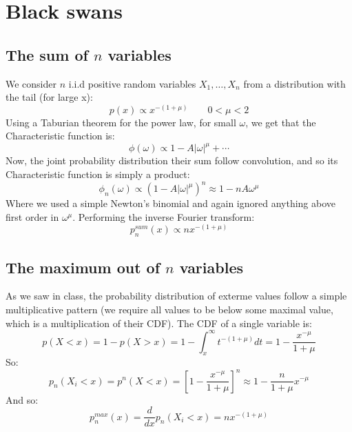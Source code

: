 \documentclass{article}
\begin{document}
\newpage
\section{Black swans}
\subsection{The sum of $n$ variables}
We consider $n$ i.i.d positive random variables $X_1, \dots, X_n$ from a distribution with the tail (for large x):
\begin{equation}
    p(x) \propto x^{-(1 + \mu)} \qquad 0 < \mu < 2
\end{equation}
Using a Taburian theorem for the power law, for small $\omega$, we get that the Characteristic function is:
\begin{equation}
    \phi(\omega) \propto 1 - A |\omega|^\mu + \cdots
\end{equation}
Now, the joint probability distribution their sum follow convolution, and so its Characteristic function is simply a product:
\begin{equation}
    \phi_n(\omega) \propto (1 - A |\omega|^\mu)^n \approx 1 - nA\omega^\mu 
\end{equation}
Where we used a simple Newton's binomial and again ignored anything above first order in $\omega^\mu$. Performing the inverse Fourier transform:
\begin{equation}
    p_n^{sum}(x) \propto nx^{-(1 + \mu)}
\end{equation}
\subsection{The maximum out of $n$ variables}
As we saw in class, the probability distribution of exterme values follow a simple multiplicative pattern (we require all values to be below some maximal value, which is a multiplication of their CDF). The CDF of a single variable is:
\begin{equation}
    p(X < x) = 1 - p(X > x) = 1 - \int_x^\infty t^{-(1 + \mu)}dt = 1 - \frac{x^{-\mu}}{1 + \mu}
\end{equation}
So:
\begin{equation}
    p_n(X_i < x) = p^n(X < x) = \left[1 - \frac{x^{-\mu}}{1 + \mu}\right]^n \approx 1 - \frac{n}{1 + \mu}x^{-\mu}
\end{equation}
And so:
\begin{equation}
    p_n^{max}(x) = \frac{d}{dx}p_n(X_i < x) = n x^{-(1 + \mu)}
\end{equation}
\end{document}
